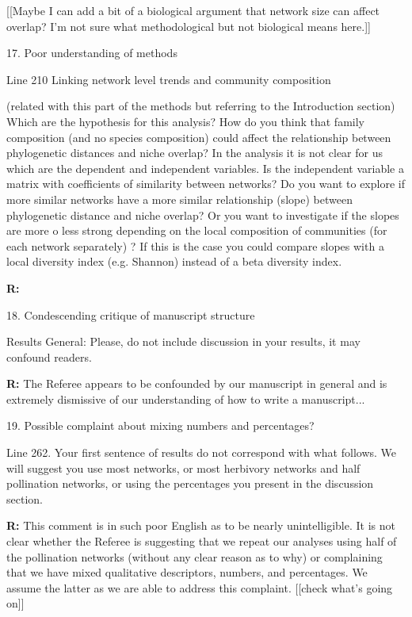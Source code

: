 \documentclass[12pt]{letter}
\newenvironment{refquote}{\bigskip \begin{it}}{\end{it}\smallskip}
\begin{document}
		[[Maybe I can add a bit of a biological argument that network size can affect overlap? I'm not sure what methodological but not biological means here.]]


	17. Poor understanding of methods

		\begin{refquote}
			Line 210 Linking network level trends and community composition

			(related with this part of the methods but referring to the Introduction section) Which are the hypothesis for this analysis? How do you think that family composition (and no species composition) could affect the relationship between phylogenetic  distances and niche overlap?
			In the analysis it is not clear for us which are the dependent and independent variables. Is the independent variable a matrix with coefficients of similarity between networks?  Do you want to explore if more similar networks have a more similar relationship (slope) between phylogenetic distance and niche overlap? Or you want to investigate if the slopes are more o less strong depending on the local composition of communities (for each network separately) ? If this is the case you could compare slopes with a local diversity index (e.g. Shannon) instead of a beta diversity index.
		\end{refquote}

		\textbf{R:}


	18. Condescending critique of manuscript structure

		\begin{refquote}
			Results
			General: Please, do not include discussion in your results, it may confound readers.
		\end{refquote}

		\textbf{R:} The Referee appears to be confounded by our manuscript in general and is extremely dismissive of our understanding of how to write a manuscript...


	19. Possible complaint about mixing numbers and percentages?

		\begin{refquote}
			Line 262. Your first sentence of results do not correspond with what follows. We will suggest you use most networks, or most herbivory networks and half pollination networks, or using the percentages you present in the discussion section.
		\end{refquote}

		\textbf{R:} This comment is in such poor English as to be nearly unintelligible. It is not clear whether the Referee is suggesting that we repeat our analyses using half of the pollination networks (without any clear reason as to why) or complaining that we have mixed qualitative descriptors, numbers, and percentages. We assume the latter as we are able to address this complaint. [[check what's going on]] 
\end{document}
